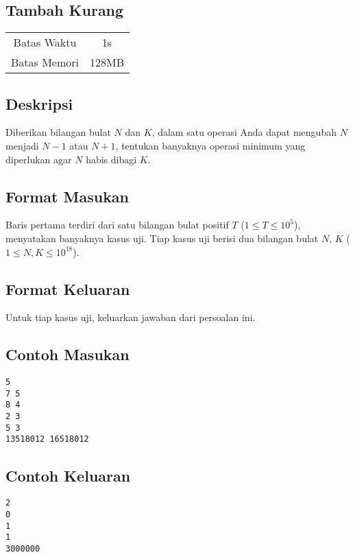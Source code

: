 \documentclass{article}
\begin{document}
\begin{center}
    \section*{Tambah Kurang} %

    \begin{tabular}{ | c c | }
        \hline
        Batas Waktu  & 1s \\    %
        Batas Memori & 128MB \\  %
        \hline
    \end{tabular}
\end{center}

\subsection*{Deskripsi}

Diberikan bilangan bulat $N$ dan $K$, dalam satu operasi Anda dapat mengubah $N$ menjadi $N - 1$ atau $N + 1$, tentukan banyaknya operasi minimum yang diperlukan agar $N$ habis dibagi $K$.

\subsection*{Format Masukan}

Baris pertama terdiri dari satu bilangan bulat positif $T$ ($1 \leq T \leq 10^5$), menyatakan banyaknya kasus uji.
Tiap kasus uji berisi dua bilangan bulat $N$, $K$ ($1 \leq N, K \leq 10^{18}$).

\subsection*{Format Keluaran}

Untuk tiap kasus uji, keluarkan jawaban dari persoalan ini.

\begin{multicols}{2}
\subsection*{Contoh Masukan}
\begin{lstlisting}
5
7 5
8 4
2 3
5 3
13518012 16518012
\end{lstlisting}
\columnbreak
\subsection*{Contoh Keluaran}
\begin{lstlisting}
2
0
1
1
3000000
\end{lstlisting}
\vfill
\null
\end{multicols}


\pagebreak
\end{document}

